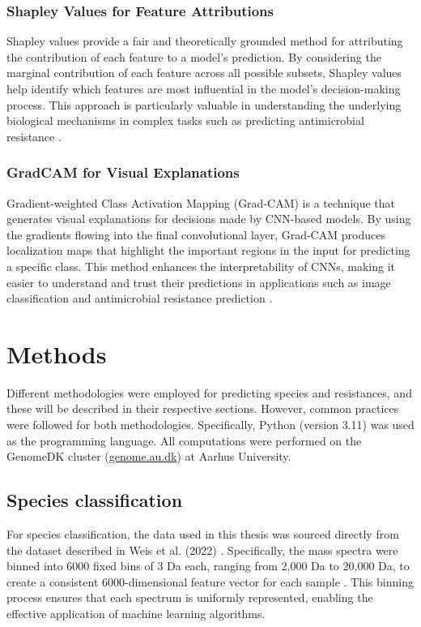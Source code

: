 \documentclass[english,11pt,a4paper,titlepage]{article}
\begin{document}
	\subsubsection*{Shapley Values for Feature Attributions}
	Shapley values provide a fair and theoretically grounded method for attributing the contribution of each feature to a model's prediction. By considering the marginal contribution of each feature across all possible subsets, Shapley values help identify which features are most influential in the model's decision-making process. This approach is particularly valuable in understanding the underlying biological mechanisms in complex tasks such as predicting antimicrobial resistance \cite{wrobelEfficientExplanationIndividual}.
	
	\subsubsection*{GradCAM for Visual Explanations}
	Gradient-weighted Class Activation Mapping (Grad-CAM) is a technique that generates visual explanations for decisions made by CNN-based models. By using the gradients flowing into the final convolutional layer, Grad-CAM produces localization maps that highlight the important regions in the input for predicting a specific class. This method enhances the interpretability of CNNs, making it easier to understand and trust their predictions in applications such as image classification and antimicrobial resistance prediction \cite{selvarajuGradCAMVisualExplanations2020}.
		
\section*{Methods}
	Different methodologies were employed for predicting species and resistances, and these will be described in their respective sections. However, common practices were followed for both methodologies. Specifically, Python (version 3.11) \cite{python} was used as the programming language. All computations were performed on the GenomeDK cluster (\url{genome.au.dk}) at Aarhus University.
	
	\subsection*{Species classification}
	For species classification, the data used in this thesis was sourced directly from the dataset described in Weis et al. (2022) \cite{weis2021driams,weisDirectAntimicrobialResistance2022}. Specifically, the mass spectra were binned into 6000 fixed bins of 3 Da each, ranging from 2,000 Da to 20,000 Da, to create a consistent 6000-dimensional feature vector for each sample . This binning process ensures that each spectrum is uniformly represented, enabling the effective application of machine learning algorithms.
	
\end{document}

